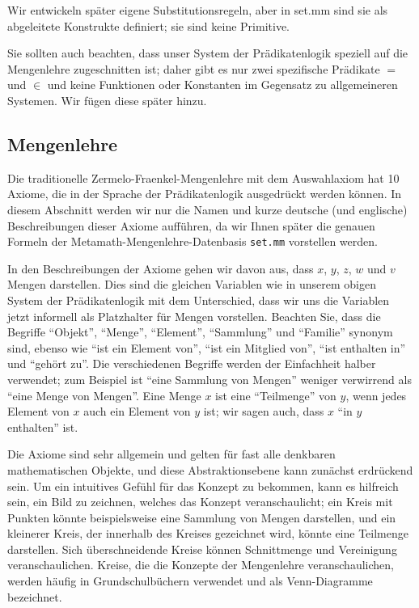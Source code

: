 Wir entwickeln später eigene Substitutionsregeln, aber in set.mm sind sie als abgeleitete Konstrukte definiert; sie sind keine Primitive.

Sie sollten auch beachten, dass unser System der Prädikatenlogik speziell auf die Mengenlehre zugeschnitten ist; daher gibt es nur zwei spezifische Prädikate $=$ und $\in$ und keine Funktionen oder Konstanten im Gegensatz zu allgemeineren Systemen. Wir fügen diese später hinzu.

\subsection{Mengenlehre}

Die traditionelle Zermelo-Fraenkel-Mengenlehre mit dem Auswahlaxiom hat 10 Axiome, die in der Sprache der Prädikatenlogik ausgedrückt werden können.  In diesem Abschnitt werden wir nur die Namen und kurze deutsche (und englische) Beschreibungen dieser Axiome aufführen, da wir Ihnen später die genauen Formeln der Metamath-Mengenlehre-Datenbasis \texttt{set.mm} vorstellen werden.

In den Beschreibungen der Axiome gehen wir davon aus, dass $x$, $y$, $z$, $w$ und $v$ Mengen darstellen.  Dies sind die gleichen Variablen wie in unserem obigen System der Prädikatenlogik mit dem Unterschied, dass wir uns die Variablen jetzt informell als Platzhalter für Mengen vorstellen.  Beachten Sie, dass die Begriffe "`Objekt"', "`Menge"', "`Element"', "`Sammlung"' und "`Familie"' synonym sind, ebenso wie "`ist ein Element von"', "`ist ein Mitglied von"', "`ist enthalten in"' und "`gehört zu"'.  Die verschiedenen Begriffe werden der Einfachheit halber verwendet; zum Beispiel ist "`eine Sammlung von Mengen"' weniger verwirrend als "`eine Menge von Mengen"'. Eine Menge $x$ ist eine "`Teilmenge"' von $y$, wenn jedes Element von $x$ auch ein Element von $y$ ist; wir sagen auch, dass $x$ "`in $y$ enthalten"' ist.

Die Axiome sind sehr allgemein und gelten für fast alle denkbaren mathematischen Objekte, und diese Abstraktionsebene kann zunächst erdrückend sein.  Um ein intuitives Gefühl für das Konzept zu bekommen, kann es hilfreich sein, ein Bild zu zeichnen, welches das Konzept veranschaulicht; ein Kreis mit Punkten könnte beispielsweise eine Sammlung von Mengen darstellen, und ein kleinerer Kreis, der innerhalb des Kreises gezeichnet wird, könnte eine Teilmenge darstellen. Sich überschneidende Kreise können Schnittmenge und Vereinigung veranschaulichen.  Kreise, die die Konzepte der Mengenlehre veranschaulichen, werden häufig in Grundschulbüchern verwendet und als Venn-Diagramme bezeichnet.

